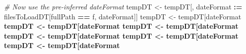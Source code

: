 \documentclass[]{article}
\newenvironment{Shaded}{\begin{snugshade}}{\end{snugshade}}
\newcommand{\KeywordTok}[1]{\textcolor[rgb]{0.13,0.29,0.53}{\textbf{#1}}}
\newcommand{\DataTypeTok}[1]{\textcolor[rgb]{0.13,0.29,0.53}{#1}}
\newcommand{\StringTok}[1]{\textcolor[rgb]{0.31,0.60,0.02}{#1}}
\newcommand{\CommentTok}[1]{\textcolor[rgb]{0.56,0.35,0.01}{\textit{#1}}}
\newcommand{\OperatorTok}[1]{\textcolor[rgb]{0.81,0.36,0.00}{\textbf{#1}}}
\newcommand{\ErrorTok}[1]{\textcolor[rgb]{0.64,0.00,0.00}{\textbf{#1}}}
\newcommand{\NormalTok}[1]{#1}
\begin{document}
\begin{Shaded}
\begin{Highlighting}[]
      \CommentTok{# Now use the pre-inferred dateFormat}
\NormalTok{      tempDT <-}\StringTok{ }\NormalTok{tempDT[, dateFormat }\OperatorTok{:}\ErrorTok{=}\StringTok{ }\NormalTok{filesToLoadDT[fullPath }\OperatorTok{==}\StringTok{ }\NormalTok{f, dateFormat]]}
\NormalTok{      tempDT <-}\StringTok{ }\NormalTok{tempDT[dateFormat }\OperatorTok{%
\NormalTok{      tempDT <-}\StringTok{ }\NormalTok{tempDT[dateFormat }\OperatorTok{%
\NormalTok{      tempDT <-}\StringTok{ }\NormalTok{tempDT[dateFormat }\OperatorTok{%
\NormalTok{      tempDT <-}\StringTok{ }\NormalTok{tempDT[dateFormat }\OperatorTok{%
\NormalTok{      tempDT <-}\StringTok{ }\NormalTok{tempDT[dateFormat }\OperatorTok{%
\NormalTok{      tempDT <-}\StringTok{ }\NormalTok{tempDT[dateFormat }\OperatorTok{%
}}}}}}
\end{Highlighting}
\end{Shaded}
\end{document}
